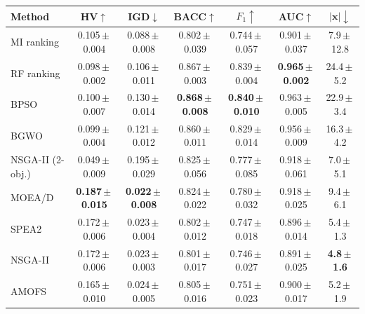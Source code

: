\begin{tabular}{lcccccc}
\toprule
Method & HV$\uparrow$ & IGD$\downarrow$ & BACC$\uparrow$ & $F_1\uparrow$ & AUC$\uparrow$ & $|\mathbf{x}|\downarrow$ \\
\midrule
MI ranking & 0.105\,$\pm$\,0.004 & 0.088\,$\pm$\,0.008 & 0.802\,$\pm$\,0.039 & 0.744\,$\pm$\,0.057 & 0.901\,$\pm$\,0.037 & 7.9\,$\pm$\,12.8 \\
RF ranking & 0.098\,$\pm$\,0.002 & 0.106\,$\pm$\,0.011 & 0.867\,$\pm$\,0.003 & 0.839\,$\pm$\,0.004 & \textbf{0.965\,$\pm$\,0.002} & 24.4\,$\pm$\,5.2 \\
BPSO & 0.100\,$\pm$\,0.007 & 0.130\,$\pm$\,0.014 & \textbf{0.868\,$\pm$\,0.008} & \textbf{0.840\,$\pm$\,0.010} & 0.963\,$\pm$\,0.005 & 22.9\,$\pm$\,3.4 \\
BGWO & 0.099\,$\pm$\,0.004 & 0.121\,$\pm$\,0.012 & 0.860\,$\pm$\,0.011 & 0.829\,$\pm$\,0.014 & 0.956\,$\pm$\,0.009 & 16.3\,$\pm$\,4.2 \\
NSGA-II (2-obj.) & 0.049\,$\pm$\,0.009 & 0.195\,$\pm$\,0.029 & 0.825\,$\pm$\,0.056 & 0.777\,$\pm$\,0.085 & 0.918\,$\pm$\,0.061 & 7.0\,$\pm$\,5.1 \\
MOEA/D & \textbf{0.187\,$\pm$\,0.015} & \textbf{0.022\,$\pm$\,0.008} & 0.824\,$\pm$\,0.022 & 0.780\,$\pm$\,0.032 & 0.918\,$\pm$\,0.025 & 9.4\,$\pm$\,6.1 \\
SPEA2 & 0.172\,$\pm$\,0.006 & 0.023\,$\pm$\,0.004 & 0.802\,$\pm$\,0.012 & 0.747\,$\pm$\,0.018 & 0.896\,$\pm$\,0.014 & 5.4\,$\pm$\,1.3 \\
NSGA-II & 0.172\,$\pm$\,0.006 & 0.023\,$\pm$\,0.003 & 0.801\,$\pm$\,0.017 & 0.746\,$\pm$\,0.027 & 0.891\,$\pm$\,0.025 & \textbf{4.8\,$\pm$\,1.6} \\
AMOFS & 0.165\,$\pm$\,0.010 & 0.024\,$\pm$\,0.005 & 0.805\,$\pm$\,0.016 & 0.751\,$\pm$\,0.023 & 0.900\,$\pm$\,0.017 & 5.2\,$\pm$\,1.9 \\
\bottomrule
\end{tabular}
